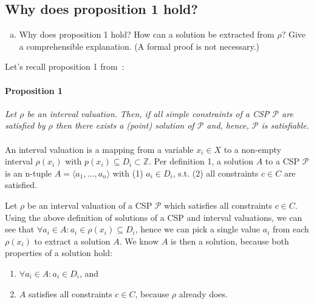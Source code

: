 \subsection{Why does proposition 1 hold?}\label{ssec:prop1}

\begin{enumerate}[(a)]
\item Why does proposition 1 hold? How can a solution be extracted from $\rho$? Give a comprehensible explanation. (A formal proof is not necessary.)
\end{enumerate}
Let's recall proposition 1 from~\cite{MF19}:

\paragraph{Proposition 1}
\emph{Let $\rho$ be an interval valuation.}
\emph{Then, if all simple constraints of a CSP $\mathcal{P}$ are satisfied by $\rho$ then there exists a (point) solution of $\mathcal{P}$ and, hence, $\mathcal{P}$ is satisfiable.}


\paragraph{}
An interval valuation is a mapping from a variable $x_i \in X$ to a non-empty interval $\rho(x_i)$ with $p(x_i) \subseteq D_i \subset \mathbb{Z}$.
Per definition 1, a solution $A$ to a CSP $\mathcal{P}$ is an n-tuple $A = \langle a_1, ..., a_n \rangle$ with (1) $a_i \in D_i$, s.t. (2) all constraints $c \in C$ are satisfied.~\cite{MF19}

Let $\rho$ be an interval valuation of a CSP $\mathcal{P}$ which satisfies all constraints $c \in C$.
Using the above definition of solutions of a CSP and interval valuations, we can see that $\forall a_i \in A: a_i \in \rho(x_i) \subseteq D_i$, hence we can pick a single value $a_i$ from each $\rho(x_i)$ to extract a solution $A$.
We know $A$ is then a solution, because both properties of a solution hold:

\begin{enumerate}[(1)]
    \item $\forall a_i \in A: a_i \in D_i$, and
    \item $A$ satisfies all constraints $c \in C$, because $\rho$ already does.
\end{enumerate}
